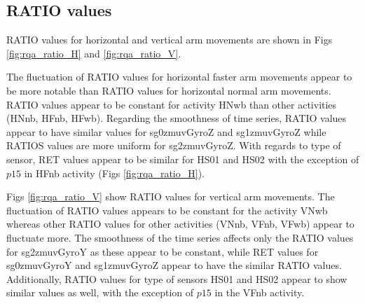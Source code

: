 \newpage
\subsection{RATIO values}

RATIO values for horizontal and 
vertical arm movements are shown in Figs \ref{fig:rqa_ratio_H} and 
\ref{fig:rqa_ratio_V}.

The fluctuation of RATIO values for horizontal faster arm movements 
appear to be more notable than RATIO values for horizontal normal arm 
movements. RATIO values appear to be constant for activity HNwb than
other activities (HNnb, HFnb, HFwb).
Regarding the smoothness of time series, RATIO values appear to have 
similar values for sg0zmuvGyroZ and sg1zmuvGyroZ while RATIOS values 
are more uniform for sg2zmuvGyroZ.
With regards to type of sensor, 
RET values appear to be similar for HS01 and HS02 with the exception of
$p15$ in HFnb activity (Figs \ref{fig:rqa_ratio_H}).

Figs \ref{fig:rqa_ratio_V} show RATIO values for vertical arm movements.
The fluctuation of RATIO values appears to be constant for the activity 
VNwb whereas other RATIO values for other activities (VNnb, VFnb, VFwb) 
appear to fluctuate more.
The smoothness of the time series affects only the RATIO values for 
sg2zmuvGyroY as these appear to be constant, while RET values for 
sg0zmuvGyroY and sg1zmuvGyroZ appear to have the similar RATIO values.
Additionally, RATIO values for type of sensors HS01 and HS02 appear 
to show similar values as well, with the exception of $p15$ in the 
VFnb activity.




